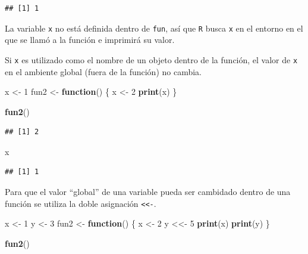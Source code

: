 \documentclass[]{book}
\newenvironment{Shaded}{\begin{snugshade}}{\end{snugshade}}
\newcommand{\KeywordTok}[1]{\textcolor[rgb]{0.13,0.29,0.53}{\textbf{#1}}}
\newcommand{\DecValTok}[1]{\textcolor[rgb]{0.00,0.00,0.81}{#1}}
\newcommand{\StringTok}[1]{\textcolor[rgb]{0.31,0.60,0.02}{#1}}
\newcommand{\ControlFlowTok}[1]{\textcolor[rgb]{0.13,0.29,0.53}{\textbf{#1}}}
\newcommand{\NormalTok}[1]{#1}
\begin{document}
\begin{verbatim}
## [1] 1
\end{verbatim}

La variable \texttt{x} no está definida dentro de \texttt{fun}, así que
\texttt{R} busca \texttt{x} en el entorno en el que se llamó a la
función e imprimirá su valor.

Si \texttt{x} es utilizado como el nombre de un objeto dentro de la
función, el valor de \texttt{x} en el ambiente global (fuera de la
función) no cambia.

\begin{Shaded}
\begin{Highlighting}[]
\NormalTok{x <-}\StringTok{ }\DecValTok{1}
\NormalTok{fun2 <-}\StringTok{ }\ControlFlowTok{function}\NormalTok{() \{}
\NormalTok{    x <-}\StringTok{ }\DecValTok{2}
    \KeywordTok{print}\NormalTok{(x)}
\NormalTok{\}}

\KeywordTok{fun2}\NormalTok{()}
\end{Highlighting}
\end{Shaded}

\begin{verbatim}
## [1] 2
\end{verbatim}

\begin{Shaded}
\begin{Highlighting}[]
\NormalTok{x}
\end{Highlighting}
\end{Shaded}

\begin{verbatim}
## [1] 1
\end{verbatim}

Para que el valor ``global'' de una variable pueda ser cambidado dentro
de una función se utiliza la doble asignación
\texttt{\textless{}\textless{}-}.

\begin{Shaded}
\begin{Highlighting}[]
\NormalTok{x <-}\StringTok{ }\DecValTok{1}
\NormalTok{y <-}\StringTok{ }\DecValTok{3}
\NormalTok{fun2 <-}\StringTok{ }\ControlFlowTok{function}\NormalTok{() \{}
\NormalTok{    x <-}\StringTok{ }\DecValTok{2}
\NormalTok{    y <<-}\StringTok{ }\DecValTok{5}
    \KeywordTok{print}\NormalTok{(x)}
    \KeywordTok{print}\NormalTok{(y)}
\NormalTok{\}}

\KeywordTok{fun2}\NormalTok{()}
\end{Highlighting}
\end{Shaded}
\end{document}
